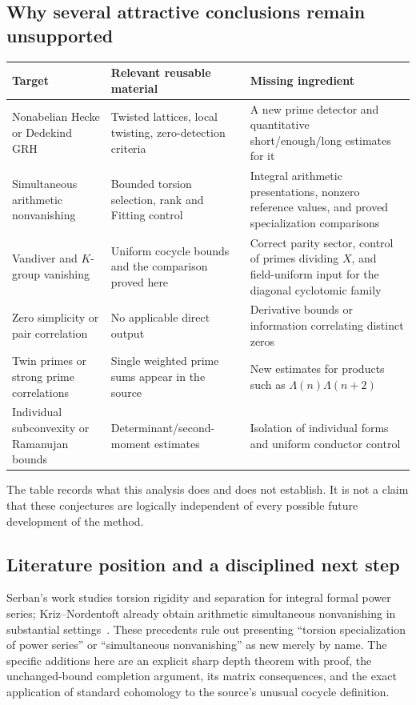 \documentclass[11pt,letterpaper]{article}
\theoremstyle{remark}
\begin{document}
\subsection{Why several attractive conclusions remain unsupported}

\begin{center}
\small
\begin{tabularx}{\textwidth}{>{\raggedright\arraybackslash}p{}YY}
\toprule
Target & Relevant reusable material & Missing ingredient\\
\midrule
Nonabelian Hecke or Dedekind GRH & Twisted lattices, local twisting,
zero-detection criteria & A new prime detector and quantitative
short/enough/long estimates for it\\
Simultaneous arithmetic nonvanishing & Bounded torsion selection, rank and
Fitting control & Integral arithmetic presentations, nonzero reference
values, and proved specialization comparisons\\
Vandiver and $K$-group vanishing & Uniform cocycle bounds and the comparison
proved here & Correct parity sector, control of primes dividing $X$, and
field-uniform input for the diagonal cyclotomic family\\
Zero simplicity or pair correlation & No applicable direct output &
Derivative bounds or information correlating distinct zeros\\
Twin primes or strong prime correlations & Single weighted prime sums
appear in the source & New estimates for products such as
$\Lambda(n)\Lambda(n+2)$\\
Individual subconvexity or Ramanujan bounds & Determinant/second-moment
estimates & Isolation of individual forms and uniform conductor control\\
\bottomrule
\end{tabularx}
\end{center}

The table records what this analysis does and does not establish. It is
not a claim that these conjectures are logically independent of every
possible future development of the method.

\subsection{Literature position and a disciplined next step}

Serban's work studies torsion rigidity and separation for integral formal
power series; Kriz--Nordentoft already obtain arithmetic simultaneous
nonvanishing in substantial settings~\cite{serban,kn}. These precedents
rule out presenting ``torsion specialization of power series'' or
``simultaneous nonvanishing'' as new merely by name. The specific additions
here are an explicit sharp depth theorem with proof, the unchanged-bound
completion argument, its matrix consequences, and the exact application
of standard cohomology to the source's unusual cocycle definition.
\end{document}
